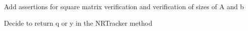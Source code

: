 
\begin{DoxyRefList}
\item[Member \mbox{\hyperlink{utils_8h_ad2246d831bd56822936b616e92e12b76}{Linear\+Solve}} (Matrix\+Xd Amat, Vector\+Xd bvec)]\label{todo__todo000002}%
%
Add assertions for square matrix verification and verification of sizes of A and b  
\item[Member \mbox{\hyperlink{classRootTracker_a1747f62a28f6439be32a3284670630d0}{Root\+Tracker::N\+R\+Tracker}} (Vector\+Xd x, Vector\+Xd y, Vector\+Xd f, Matrix\+Xd Jfy, float eps=pow(10,-\/10))]\label{todo__todo000001}%
%
Decide to return q or y in the N\+R\+Tracker method 
\end{DoxyRefList}